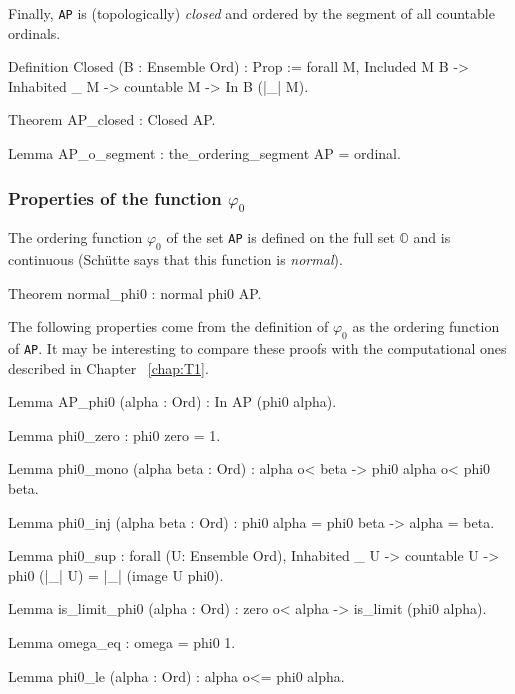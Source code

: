 {Finally, \texttt{AP} is (topologically) \emph{closed} and ordered by the segment of all countable ordinals.


\begin{Coqsrc} 
Definition Closed (B : Ensemble Ord) : Prop := 
  forall M, Included M B -> Inhabited _ M -> 
                 countable M -> In B (|_| M).
\end{Coqsrc}

\begin{Coqsrc}
Theorem AP_closed : Closed AP.

Lemma AP_o_segment :  the_ordering_segment AP = ordinal.
\end{Coqsrc}

\subsubsection{Properties of the function \texorpdfstring{$\varphi_0$}{phi0}}
 
The ordering function $\varphi_0$ of the set \texttt{AP} is defined on the full set $\mathbb{O}$ and is continuous (Schütte says that this function is \emph{normal}).

\begin{Coqsrc}
Theorem normal_phi0 : normal phi0 AP.
\end{Coqsrc}

The following properties come from  the definition of $\varphi_0$ as the ordering function of \texttt{AP}. It may be interesting to compare these proofs with the computational ones described in Chapter ~\ref{chap:T1}.

\begin{Coqsrc}
Lemma AP_phi0 (alpha : Ord) : In AP (phi0 alpha).

Lemma phi0_zero : phi0 zero =  1.

Lemma phi0_mono (alpha beta : Ord) :
  alpha o< beta ->  phi0 alpha o< phi0 beta.

Lemma phi0_inj (alpha beta : Ord) :
    phi0 alpha = phi0 beta -> alpha = beta.

Lemma phi0_sup : forall (U: Ensemble Ord),
   Inhabited _ U ->   countable U ->  phi0 (|_| U) = |_| (image U phi0).

Lemma is_limit_phi0 (alpha : Ord) :
  zero o< alpha ->  is_limit (phi0 alpha).

Lemma omega_eq : omega = phi0 1. 

Lemma phi0_le (alpha : Ord) : alpha o<= phi0 alpha.
\end{Coqsrc}

}
